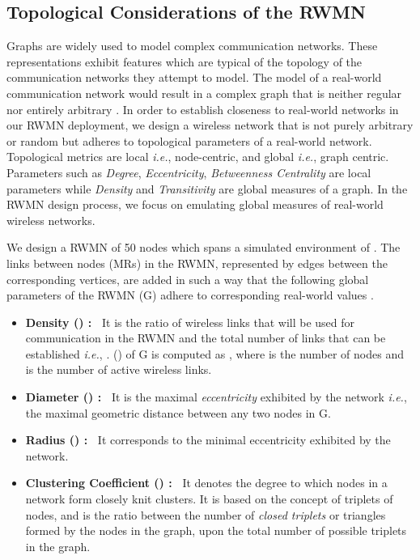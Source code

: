 \documentclass[conference]{IEEEtran}
\begin{document}
\subsection{Topological Considerations of the RWMN}
Graphs are widely used to model complex communication networks. These representations exhibit features which are typical of the topology of the communication networks they attempt to model. The model of a real-world communication network would result in a complex graph that is neither regular nor entirely arbitrary \cite{Complex}. In order to establish closeness to real-world networks in our RWMN deployment, we design a wireless network that is not purely arbitrary or random but adheres to topological parameters of a real-world network. Topological metrics are local \emph{i.e.}, node-centric, and global \emph{i.e.}, graph centric. Parameters such as \textit{Degree}, \textit{Eccentricity}, \textit{Betweenness Centrality} are local parameters while \textit{Density} and \textit{Transitivity} are global measures of a graph. In the RWMN design process, we focus on emulating global measures of real-world wireless networks.

We design a RWMN of 50 nodes which spans a simulated environment of . The links between nodes (MRs) in the RWMN, represented by edges between the corresponding vertices, are added in such a way that the following global parameters of the RWMN (G) adhere to corresponding real-world values \cite{TOPO}. 
\begin{itemize}
 \item \textbf{Density () :~} It is the ratio of wireless links that will be used for communication in the RWMN and the total number of links that can be established \emph{i.e.}, . () of G is computed as , where  is the number of nodes and  is the number of active wireless links.
 \item \textbf{Diameter () :~} It is the maximal \textit{eccentricity} exhibited by the network \emph{i.e.}, the maximal geometric distance between any two nodes in  G.
 \item \textbf{Radius () :~} It corresponds to the minimal eccentricity exhibited by the network.
 \item \textbf{Clustering Coefficient () :~} It denotes the degree to which nodes in a network form closely knit clusters. It is based on the concept of triplets of nodes, and is the ratio between the number of \textit{closed triplets} or triangles formed by the nodes in the graph, upon the total number of possible triplets in the graph.
\end{itemize}
\end{document}
